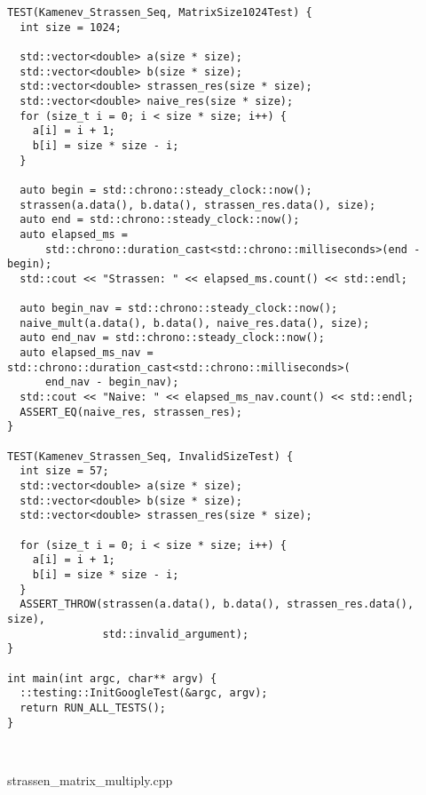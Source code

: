 \documentclass{report}
\begin{document}
\begin{lstlisting}
TEST(Kamenev_Strassen_Seq, MatrixSize1024Test) {
  int size = 1024;

  std::vector<double> a(size * size);
  std::vector<double> b(size * size);
  std::vector<double> strassen_res(size * size);
  std::vector<double> naive_res(size * size);
  for (size_t i = 0; i < size * size; i++) {
    a[i] = i + 1;
    b[i] = size * size - i;
  }

  auto begin = std::chrono::steady_clock::now();
  strassen(a.data(), b.data(), strassen_res.data(), size);
  auto end = std::chrono::steady_clock::now();
  auto elapsed_ms =
      std::chrono::duration_cast<std::chrono::milliseconds>(end - begin);
  std::cout << "Strassen: " << elapsed_ms.count() << std::endl;

  auto begin_nav = std::chrono::steady_clock::now();
  naive_mult(a.data(), b.data(), naive_res.data(), size);
  auto end_nav = std::chrono::steady_clock::now();
  auto elapsed_ms_nav = std::chrono::duration_cast<std::chrono::milliseconds>(
      end_nav - begin_nav);
  std::cout << "Naive: " << elapsed_ms_nav.count() << std::endl;
  ASSERT_EQ(naive_res, strassen_res);
}

TEST(Kamenev_Strassen_Seq, InvalidSizeTest) {
  int size = 57;
  std::vector<double> a(size * size);
  std::vector<double> b(size * size);
  std::vector<double> strassen_res(size * size);

  for (size_t i = 0; i < size * size; i++) {
    a[i] = i + 1;
    b[i] = size * size - i;
  }
  ASSERT_THROW(strassen(a.data(), b.data(), strassen_res.data(), size),
               std::invalid_argument);
}

int main(int argc, char** argv) {
  ::testing::InitGoogleTest(&argc, argv);
  return RUN_ALL_TESTS();
}



\end{lstlisting}
strassen\_matrix\_multiply.cpp
\end{document}
